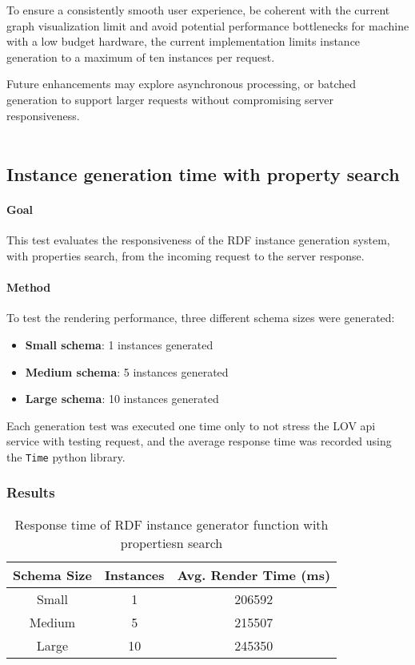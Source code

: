 To ensure a consistently smooth user experience, be coherent with the current graph visualization limit and avoid potential performance bottlenecks for machine with a low budget hardware, the current implementation limits instance generation to a maximum of ten instances per request. 

Future enhancements may explore asynchronous processing, or batched generation to support larger requests without compromising server responsiveness.
\\
\\
\subsection{Instance generation time with property search}

\paragraph{Goal}
This test evaluates the responsiveness of the RDF instance generation system, with properties search, from the incoming request to the server response.

\paragraph{Method}
To test the rendering performance, three different schema sizes were generated:
\begin{itemize}
    \item \textbf{Small schema}: 1 instances generated
    \item \textbf{Medium schema}: 5 instances generated
    \item \textbf{Large schema}: 10 instances generated
\end{itemize}

Each generation test was executed one time only to not stress the LOV api service with testing request, and the average response time was recorded using the \texttt{Time} python library.

\subsubsection{Results}

\begin{table}[H]
\centering
\begin{tabular}{|c|c|c|}
\hline
\textbf{Schema Size} & \textbf{Instances} & \textbf{Avg. Render Time (ms)} \\ \hline
Small & 1 & 206592 \\ \hline
Medium & 5 & 215507\\ \hline
Large & 10 & 245350 \\ \hline
\end{tabular}
\caption{Response time of RDF instance generator function with propertiesn search}
\label{tab:rendering-times}
\end{table}

